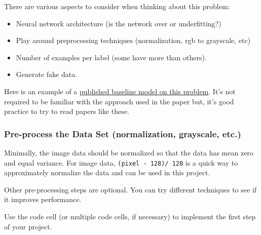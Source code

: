 \documentclass[11pt]{article}
\providecommand{\tightlist}{%
      \setlength{\itemsep}{0pt}\setlength{\parskip}{0pt}}
\begin{document}
There are various aspects to consider when thinking about this problem:

\begin{itemize}
\tightlist
\item
  Neural network architecture (is the network over or underfitting?)
\item
  Play around preprocessing techniques (normalization, rgb to grayscale,
  etc)
\item
  Number of examples per label (some have more than others).
\item
  Generate fake data.
\end{itemize}

Here is an example of a
\href{http://yann.lecun.com/exdb/publis/pdf/sermanet-ijcnn-11.pdf}{published
baseline model on this problem}. It's not required to be familiar with
the approach used in the paper but, it's good practice to try to read
papers like these.

    \hypertarget{pre-process-the-data-set-normalization-grayscale-etc.}{%
\subsubsection{Pre-process the Data Set (normalization, grayscale,
etc.)}\label{pre-process-the-data-set-normalization-grayscale-etc.}}

    Minimally, the image data should be normalized so that the data has mean
zero and equal variance. For image data, \texttt{(pixel\ -\ 128)/\ 128}
is a quick way to approximately normalize the data and can be used in
this project.

Other pre-processing steps are optional. You can try different
techniques to see if it improves performance.

Use the code cell (or multiple code cells, if necessary) to implement
the first step of your project.
\end{document}
